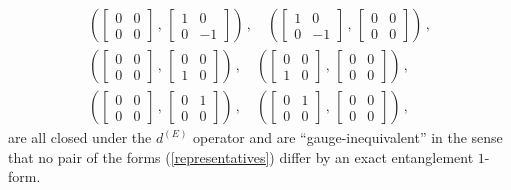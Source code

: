 \documentclass[12pt]{article}
\numberwithin{equation}{section}
\begin{document}
\begin{gather}
    \left( \begin{bmatrix} 0 & 0 \\ 0 & 0 \end{bmatrix} \, , \,  \begin{bmatrix} 1 & 0 \\ 0 & -1 \end{bmatrix} \right) \, , \quad \left( \begin{bmatrix} 1 & 0 \\ 0 & -1 \end{bmatrix} \, , \, \begin{bmatrix} 0 & 0 \\ 0 & 0 \end{bmatrix} \right) \, , \nonumber \\
    \left( \begin{bmatrix} 0 & 0 \\ 0 & 0 \end{bmatrix} \, , \,  \begin{bmatrix} 0 & 0 \\ 1 & 0 \end{bmatrix} \right) \, , \quad \left( \begin{bmatrix} 0 & 0 \\ 1 & 0 \end{bmatrix} \, , \, \begin{bmatrix} 0 & 0 \\ 0 & 0 \end{bmatrix} \right) \, , \nonumber \\
    \left( \begin{bmatrix} 0 & 0 \\ 0 & 0 \end{bmatrix} \, , \,  \begin{bmatrix} 0 & 1 \\ 0 & 0 \end{bmatrix} \right) \, , \quad \left( \begin{bmatrix} 0 & 1 \\ 0 & 0 \end{bmatrix} \, , \, \begin{bmatrix} 0 & 0 \\ 0 & 0 \end{bmatrix} \right) \, , \label{representatives}
\end{gather}
%
are all closed under the $d^{(E)}$ operator and are ``gauge-inequivalent'' in the sense that no pair of the forms (\ref{representatives}) differ by an exact entanglement $1$-form.
\end{document}
